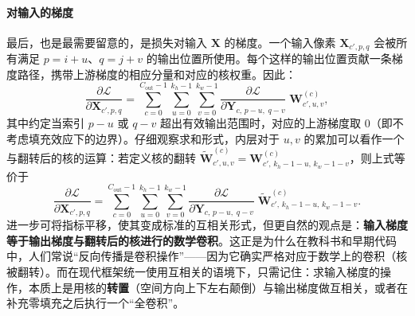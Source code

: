 \paragraph{对输入的梯度}
最后，也是最需要留意的，是损失对输入 $\mathbf{X}$ 的梯度。一个输入像素 $\mathbf{X}_{c',p,q}$ 会被所有满足 $p = i+u$、$q = j+v$ 的输出位置所使用。每个这样的输出位置贡献一条梯度路径，携带上游梯度的相应分量和对应的核权重。因此：
\[
\frac{\partial\mathcal{L}}{\partial \mathbf{X}_{c',p,q}} = \sum_{c=0}^{C_{\text{out}}-1} \sum_{u=0}^{k_h-1}\sum_{v=0}^{k_w-1} 
\frac{\partial\mathcal{L}}{\partial \mathbf{Y}_{c,\,p-u,\;q-v}} \; \mathbf{W}^{(c)}_{c',u,v},
\]
其中约定当索引 $p-u$ 或 $q-v$ 超出有效输出范围时，对应的上游梯度取 0（即不考虑填充效应下的边界）。仔细观察求和形式，内层对于 $u,v$ 的累加可以看作一个与翻转后的核的运算：若定义核的翻转 $\widetilde{\mathbf{W}}^{(c)}_{c',u,v} = \mathbf{W}^{(c)}_{c',\,k_h-1-u,\,k_w-1-v}$，则上式等价于
\[
\frac{\partial\mathcal{L}}{\partial \mathbf{X}_{c',p,q}} = \sum_{c=0}^{C_{\text{out}}-1} \sum_{u=0}^{k_h-1}\sum_{v=0}^{k_w-1} 
\frac{\partial\mathcal{L}}{\partial \mathbf{Y}_{c,\,p-u,\;q-v}} \; \widetilde{\mathbf{W}}^{(c)}_{c',\,k_h-1-u,\,k_w-1-v}.
\]
进一步可将指标平移，使其变成标准的互相关形式，但更自然的观点是：\textbf{输入梯度等于输出梯度与翻转后的核进行的数学卷积}。这正是为什么在教科书和早期代码中，人们常说“反向传播是卷积操作”——因为它确实严格对应于数学上的卷积（核被翻转）。而在现代框架统一使用互相关的语境下，只需记住：求输入梯度的操作，本质上是用核的\textbf{转置}（空间方向上下左右颠倒）与输出梯度做互相关，或者在补充零填充之后执行一个“全卷积”。

